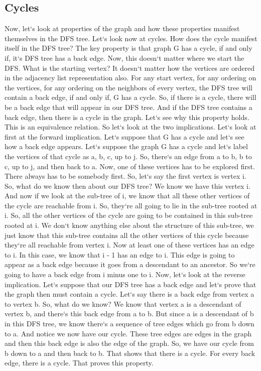 \subsection{Cycles}
Now, let`s look at properties of the graph and how these properties manifest themselves in the DFS tree.
Let`s look now at cycles.
How does the cycle manifest itself in the DFS tree? The key property is that graph G has a cycle, if and only if, it`s DFS tree has a back edge.
Now, this doesn`t matter where we start the DFS\@.
What is the starting vertex? It doesn`t matter how the vertices are ordered in the adjacency list representation also.
For any start vertex, for any ordering on the vertices, for any ordering on the neighbors of every vertex, the DFS tree will contain a back edge, if and only if, G has a cycle.
So, if there is a cycle, there will be a back edge that will appear in our DFS tree.
And if the DFS tree contains a back edge, then there is a cycle in the graph.
Let`s see why this property holds.
This is an equivalence relation.
So let`s look at the two implications.
Let`s look at first at the forward implication.
Let`s suppose that G has a cycle and let`s see how a back edge appears.
Let`s suppose the graph G has a cycle and let`s label the vertices of that cycle as a, b, c, up to j.
So, there`s an edge from a to b, b to c, up to j, and then back to a.
Now, one of these vertices has to be explored first.
There always has to be somebody first.
So, let`s say the first vertex is vertex i.
So, what do we know then about our DFS tree? We know we have this vertex i.
And now if we look at the sub-tree of i, we know that all these other vertices of the cycle are reachable from i.
So, they`re all going to lie in the sub-tree rooted at i.
So, all the other vertices of the cycle are going to be contained in this sub-tree rooted at i.
We don`t know anything else about the structure of this sub-tree, we just know that this sub-tree contains all the other vertices of this cycle because they`re all reachable from vertex i.
Now at least one of these vertices has an edge to i.
In this case, we know that i - 1 has an edge to i.
This edge is going to appear as a back edge because it goes from a descendant to an ancestor.
So we`re going to have a back edge from i minus one to i.
Now, let`s look at the reverse implication.
Let`s suppose that our DFS tree has a back edge and let`s prove that the graph then must contain a cycle.
Let`s say there is a back edge from vertex a to vertex b.
So, what do we know? We know that vertex a is a descendant of vertex b, and there`s this back edge from a to b.
But since a is a descendant of b in this DFS tree, we know there`s a sequence of tree edges which go from b down to a.
And notice we now have our cycle.
These tree edges are edges in the graph and then this back edge is also the edge of the graph.
So, we have our cycle from b down to a and then back to b.
That shows that there is a cycle.
For every back edge, there is a cycle.
That proves this property.


